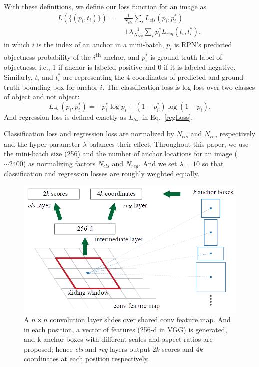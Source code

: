 \documentclass[conference]{IEEEtran}
\begin{document}
With these definitions, we define our loss function for an image as
\begin{equation}
\begin{split}
L\left(\{(p_i, t_i)\}\right) =\ &\frac{1}{N_{cls}}\sum_i L_{cls}(p_i, p_i^*)\\ &+ \lambda \frac{1}{N_{reg}}\sum_i p_i^* L_{reg}(t_i, t_i^*),
\end{split}
\label{RPNLoss}
\end{equation}
in which $i$ is the index of an anchor in a mini-batch, $p_i$ is RPN's predicted objectness probability of the $i$\textsuperscript{th} anchor, and $p_i^*$ is ground-truth label of objectness, i.e., 1 if anchor is labeled positive and 0 if it is labeled negative.
Similarly, $t_i$ and $t_i^*$ are representing the 4 coordinates of predicted and ground-truth bounding box for anchor $i$.
The classification loss is log loss over two classes of object and not object:
\begin{equation}
L_{cls}(p_i, p_i^*) = -p_i^*\log p_i + (1-p_i^*)\log (1-p_i).
\end{equation}
And regression loss is defined exactly as $L_{loc}$ in Eq.~\eqref{regLoss}.

Classification loss and regression loss are normalized by $N_{cls}$ and $N_{reg}$ respectively and the hyper-parameter $\lambda$ balances their effect.
Throughout this paper, we use the mini-batch size (256) and the number of anchor locations for an image ($\sim2400$) as normalizing factors $N_{cls}$ and $N_{reg}$. And we set $\lambda = 10$ so that classification and regression losses are roughly weighted equally.

\begin{figure}[t]
\centerline{\includegraphics[width=\linewidth]{AnchorsFig.png}}
\caption{A $n\times n$ convolution layer slides over shared conv feature map. And in each position, a vector of features (256-d in VGG) is generated, and k anchor boxes with different
scales and aspect ratios are proposed; hence \textit{cls} and \textit{reg} layers output $2k$ scores and $4k$ coordinates at each position respectively.}
\label{AnchorsFig}
\end{figure}
\end{document}
